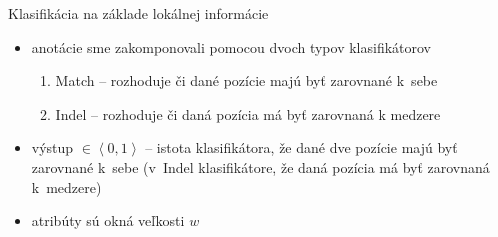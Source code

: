 \documentclass[xcolor=dvipsnames, compress, 12pt]{beamer}
\theoremstyle{definition}
\begin{document}
\begin{frame}{Klasifikácia na základe lokálnej informácie}
\begin{itemize}
  \item anotácie sme zakomponovali pomocou dvoch typov klasifikátorov
  \begin{enumerate}
    \item Match -- rozhoduje či dané pozície majú byť zarovnané k~sebe
    \item Indel -- rozhoduje či daná pozícia má byť zarovnaná k medzere
  \end{enumerate}
  \item výstup $\in \left<0,1\right>$ -- istota klasifikátora, že dané dve pozície majú byť zarovnané k~sebe (v~Indel klasifikátore, že daná pozícia má  byť zarovnaná k~medzere)
  \item atribúty sú okná veľkosti $w$
\end{itemize}
\end{frame}
\end{document}
